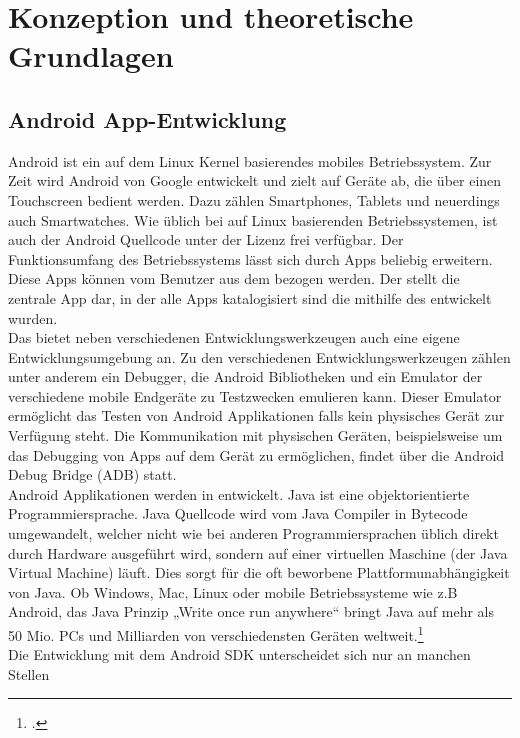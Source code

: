 \chapter{Konzeption und theoretische Grundlagen}
\label{cha:theoGrundlagen}

\section{Android App-Entwicklung}
Android ist ein auf dem Linux Kernel basierendes mobiles Betriebssystem. Zur
Zeit wird Android von Google entwickelt und zielt auf Geräte ab, die über einen
Touchscreen bedient werden. Dazu zählen Smartphones, Tablets und neuerdings auch
Smartwatches. Wie üblich bei auf Linux basierenden Betriebssystemen, ist auch
der Android Quellcode unter der  Lizenz frei verfügbar.
Der Funktionsumfang des Betriebssystems lässt sich durch Apps beliebig
erweitern. Diese Apps können vom Benutzer aus dem  bezogen werden. Der  stellt die zentrale App
dar, in der alle Apps katalogisiert sind die mithilfe des  entwickelt wurden. \\
Das  bietet neben verschiedenen
Entwicklungswerkzeugen auch eine eigene Entwicklungsumgebung an. Zu den
verschiedenen Entwicklungswerkzeugen zählen unter anderem ein Debugger, die
Android Bibliotheken und ein Emulator der verschiedene mobile Endgeräte zu
Testzwecken emulieren kann. Dieser Emulator ermöglicht das Testen von Android
Applikationen falls kein physisches Gerät zur Verfügung steht. Die Kommunikation
mit physischen Geräten, beispielsweise um das Debugging von Apps auf dem Gerät
zu ermöglichen, findet über die Android Debug Bridge (ADB) statt. \\
Android Applikationen werden in  entwickelt. Java ist eine 
objektorientierte Programmiersprache.
Java Quellcode wird vom Java Compiler in Bytecode umgewandelt, welcher
nicht wie bei anderen Programmiersprachen üblich direkt durch Hardware ausgeführt
wird, sondern auf einer virtuellen Maschine (der Java Virtual Machine) läuft.
Dies sorgt für die oft beworbene Plattformunabhängigkeit von Java. Ob Windows,
Mac, Linux oder mobile Betriebssysteme wie z.B Android, das Java Prinzip „Write
once run anywhere“ bringt Java auf mehr als 50 Mio. PCs und Milliarden von verschiedensten
Geräten weltweit.\footcite{sierra2006} \\
Die Entwicklung mit dem Android SDK unterscheidet sich nur an manchen Stellen

